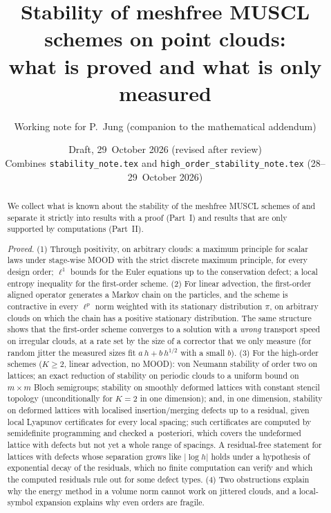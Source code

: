 \documentclass[11pt,a4paper]{article}
\title{Stability of meshfree MUSCL schemes on point clouds:\\ what is proved and what is only measured}
\author{Working note for P.~Jung (companion to the mathematical addendum)}
\date{Draft, 29~October 2026 (revised after review)\\[2pt]\small Combines \texttt{stability\_note.tex} and \texttt{high\_order\_stability\_note.tex} (28--29~October 2026)}
\theoremstyle{plain}
\theoremstyle{definition}
\theoremstyle{remark}
\numberwithin{equation}{section}
\begin{document}
\maketitle

\begin{abstract}
We collect what is known about the stability of the meshfree MUSCL schemes of \cite{JungMUSCL2026,Addendum} and separate it strictly into results with a proof (Part~I) and results that are only supported by computations (Part~II).

\emph{Proved.} (1) Through positivity, on arbitrary clouds: a maximum principle for scalar laws under stage-wise MOOD with the strict discrete maximum principle, for every design order; $\ell^1$ bounds for the Euler equations up to the conservation defect; a local entropy inequality for the first-order scheme. (2) For linear advection, the first-order aligned operator generates a Markov chain on the particles, and the scheme is contractive in every $\ell^p$ norm weighted with its stationary distribution $\pi$, on arbitrary clouds on which the chain has a positive stationary distribution. The same structure shows that the first-order scheme converges to a solution with a \emph{wrong} transport speed on irregular clouds, at a rate set by the size of a corrector that we only measure (for random jitter the measured sizes fit $a\,h+b\,h^{1/2}$ with a small $b$). (3) For the high-order schemes ($K\ge2$, linear advection, no MOOD): von Neumann stability of order two on lattices; an exact reduction of stability on periodic clouds to a uniform bound on $m\times m$ Bloch semigroups; stability on smoothly deformed lattices with constant stencil topology (unconditionally for $K=2$ in one dimension); and, in one dimension, stability on deformed lattices with localised insertion/merging defects up to a residual, given local Lyapunov certificates for every local spacing; such certificates are computed by semidefinite programming and checked a~posteriori, which covers the undeformed lattice with defects but not yet a whole range of spacings. A residual-free statement for lattices with defects whose separation grows like $|\log h|$ holds under a hypothesis of exponential decay of the residuals, which no finite computation can verify and which the computed residuals rule out for some defect types. (4) Two obstructions explain why the energy method in a volume norm cannot work on jittered clouds, and a local-symbol expansion explains why even orders are fragile.


\end{abstract}
\end{document}
